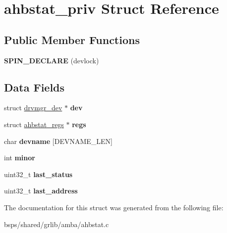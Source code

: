 \hypertarget{structahbstat__priv}{}\section{ahbstat\+\_\+priv Struct Reference}
\label{structahbstat__priv}
\subsection*{Public Member Functions}
\begin{DoxyCompactItemize}
\item 
\mbox{\label{structahbstat__priv_af3c673f119f5b98e00c551155919b382}} 
{\bfseries S\+P\+I\+N\+\_\+\+D\+E\+C\+L\+A\+RE} (devlock)
\end{DoxyCompactItemize}
\subsection*{Data Fields}
\begin{DoxyCompactItemize}
\item 
\mbox{\label{structahbstat__priv_ad7613d3a7a69f6407ebb65aaf252a8fc}} 
struct \mbox{\hyperlink{structdrvmgr__dev}{drvmgr\+\_\+dev}} $\ast$ {\bfseries dev}
\item 
\mbox{\label{structahbstat__priv_a0a0ac481fd5a44052147a7ae0215ca7c}} 
struct \mbox{\hyperlink{structahbstat__regs}{ahbstat\+\_\+regs}} $\ast$ {\bfseries regs}
\item 
\mbox{\label{structahbstat__priv_a9a9e01b03c916a4115bc2d75800ad286}} 
char {\bfseries devname} \mbox{[}D\+E\+V\+N\+A\+M\+E\+\_\+\+L\+EN\mbox{]}
\item 
\mbox{\label{structahbstat__priv_a1ac3ea5eefbd9482db9a2723f5150e80}} 
int {\bfseries minor}
\item 
\mbox{\label{structahbstat__priv_a29636b90744aa3b6e8ff2ba0517bad92}} 
uint32\+\_\+t {\bfseries last\+\_\+status}
\item 
\mbox{\label{structahbstat__priv_a2f8272cab822efc1980a5b527d6d5b9b}} 
uint32\+\_\+t {\bfseries last\+\_\+address}
\end{DoxyCompactItemize}


The documentation for this struct was generated from the following file\+:\begin{DoxyCompactItemize}
\item 
bsps/shared/grlib/amba/ahbstat.\+c\end{DoxyCompactItemize}
